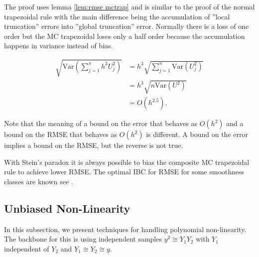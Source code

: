 \documentclass[a4paper,12pt]{article}
\begin{document}
The proof uses lemma \ref{lem:rmse mctrap}
and is similar to the proof of the normal
trapezoidal rule with the main difference being  the
accumulation of ''local truncation'' errors into ''global truncation'' error.
Normally there is a loss of one order but the MC trapezoidal loses only a half order
because the accumulation happens in variance instead of bias.

\begin{align}
    \sqrt{\text{Var}\left(\sum_{j=1}^{n} h^{3}U_{j}^{2}\right)}
     & =h^{3} \sqrt{ \sum_{j=1}^{n}\text{Var} (U_{j}^{2})} \\
     & =h^{3} \sqrt{ n \text{Var}(U^{2})}                  \\
     & = O(h^{2.5}).
\end{align}

Note that the meaning of a bound on the error that behaves as $O(h^{2})$ and
a bound on the RMSE that behaves as $O(h^{2})$ is different.
A bound on the error implies a bound on the RMSE, but
the reverse is not true.

\begin{related}
    With Stein's paradox it is always possible to bias the composite MC trapezoidal
    rule to achieve lower RMSE.
    The optimal IBC for RMSE for some smoothness classes
    are known see \cite{heinrich_optimal_2001}.
\end{related}


\subsection{Unbiased Non-Linearity}

In this subsection, we present techniques for handling polynomial non-linearity.
The backbone for this is using independent samples
$y^{2} \cong Y_{1} Y_{2}$ with $Y_{1}$ independent of $ Y_{2}$ and
$Y_{1} \cong Y_{2} \cong y$.
\end{document}
